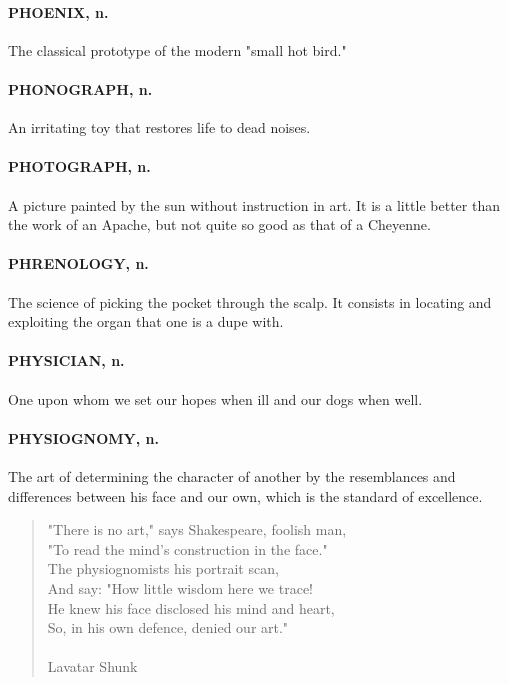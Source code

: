 \documentclass[11pt]{article}
\begin{document}
\paragraph{PHOENIX, n.}  The classical prototype of the modern "small hot bird."

\paragraph{PHONOGRAPH, n.}  An irritating toy that restores life to dead noises.

\paragraph{PHOTOGRAPH, n.}  A picture painted by the sun without instruction in
art.  It is a little better than the work of an Apache, but not quite
so good as that of a Cheyenne.

\paragraph{PHRENOLOGY, n.}  The science of picking the pocket through the scalp.
It consists in locating and exploiting the organ that one is a dupe
with.

\paragraph{PHYSICIAN, n.}  One upon whom we set our hopes when ill and our dogs
when well.

\paragraph{PHYSIOGNOMY, n.}  The art of determining the character of another by
the resemblances and differences between his face and our own, which
is the standard of excellence.

\begin{quote}   "There is no art," says Shakespeare, foolish man, \\
      "To read the mind's construction in the face." \\
  The physiognomists his portrait scan, \\
      And say:  "How little wisdom here we trace! \\
  He knew his face disclosed his mind and heart, \\
  So, in his own defence, denied our art." \\
 \\
Lavatar Shunk \end{quote}
\end{document}
